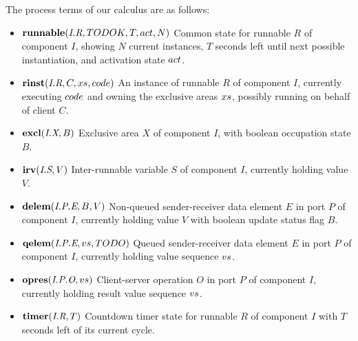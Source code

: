 \documentclass[twocolumn]{article}
\begin{document}
The process terms of our calculus are as follows:
\begin{itemize}
\item $\runnable{\Tr{R}{I}}{TODOK}{T}{\Act}{N}$  \newline
Common state for runnable $R$ of component $I$, showing $N$ current instances, $T$ seconds left until next possible instantiation, and activation state $\Act$.
\item $\rinst{\Tr{R}{I}}{C}{\Xs}{\Code}$ \newline
An instance of runnable $R$ of component $I$, currently executing $\Code$ and owning the exclusive areas $\Xs$, possibly running on behalf of client $C$.
\item $\excl{\Tx{X}{I}}{B}$ \newline
Exclusive area $X$ of component $I$, with boolean occupation state $B$.
\item $\irv{\Ts{S}{I}}{V}$ \newline
Inter-runnable variable $S$ of component $I$, currently holding value $V$.
\item $\delem{\Tep{E}{P}{I}}{B}{V}$ \newline
Non-queued sender-receiver data element $E$ in port $P$ of component $I$, currently holding value $V$ with boolean update status flag $B$.
\item $\qelem{\Tep{E}{P}{I}}{\Vs}{TODO}$ \newline
Queued sender-receiver data element $E$ in port $P$ of component $I$, currently holding value sequence $\Vs$.
\item $\opres{\Top{O}{P}{I}}{\Vs}$ \newline
Client-server operation $O$ in port $P$ of component $I$, currently holding result value sequence $\Vs$.
\item $\timer{\Tr{R}{I}}{T}$ \newline  %
Countdown timer state for runnable $R$ of component $I$ with $T$ seconds left of its current cycle.
\end{itemize}
\end{document}
